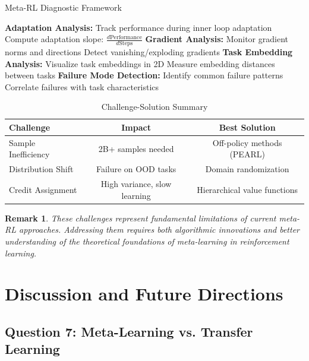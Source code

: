 \documentclass[12pt]{article}
\newtheorem{remark}{Remark}
\begin{document}
{{\begin{enumerate}
				\begin{algorithm}[H]
				\caption{Meta-RL Diagnostic Framework}
				\begin{algorithmic}[1]
				\STATE \textbf{Adaptation Analysis:}
				\STATE Track performance during inner loop adaptation
				\STATE Compute adaptation slope: $\frac{d\text{Performance}}{d\text{Steps}}$
				\STATE \textbf{Gradient Analysis:}
				\STATE Monitor gradient norms and directions
				\STATE Detect vanishing/exploding gradients
				\STATE \textbf{Task Embedding Analysis:}
				\STATE Visualize task embeddings in 2D
				\STATE Measure embedding distances between tasks
				\STATE \textbf{Failure Mode Detection:}
				\STATE Identify common failure patterns
				\STATE Correlate failures with task characteristics
				\end{algorithmic}
				\end{algorithm}
			\end{enumerate}
			
			\begin{table}[H]
			\centering
			\caption{Challenge-Solution Summary}
			\begin{tabular}{@{}lcc@{}}
			\toprule
			\textbf{Challenge} & \textbf{Impact} & \textbf{Best Solution} \\
			\midrule
			Sample Inefficiency & 2B+ samples needed & Off-policy methods (PEARL) \\
			Distribution Shift & Failure on OOD tasks & Domain randomization \\
			Credit Assignment & High variance, slow learning & Hierarchical value functions \\
			\bottomrule
			\end{tabular}
			\label{tab:challenge_solutions}
			\end{table}
			
			\begin{remark}
			These challenges represent fundamental limitations of current meta-RL approaches. Addressing them requires both algorithmic innovations and better understanding of the theoretical foundations of meta-learning in reinforcement learning.
			\end{remark}
			
			\section{Discussion and Future Directions}
			
			\subsection{Question 7: Meta-Learning vs. Transfer Learning}
			
}}
\end{document}
